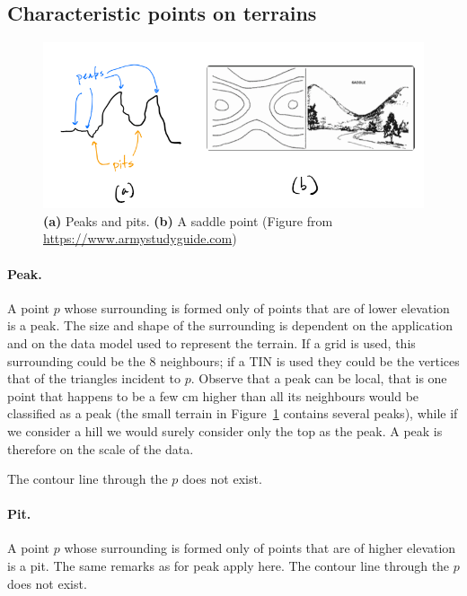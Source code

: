 \subsection{Characteristic points on terrains}

\begin{figure}
  \centering
  \includegraphics[width=\linewidth]{figs/feature_points}
  \caption{\textbf{(a)} Peaks and pits. \textbf{(b)} A saddle point (Figure from \url{https://www.armystudyguide.com})}
\label{fig:feature_points}
\end{figure}


\paragraph{Peak.}
A point $p$ whose surrounding is formed only of points that are of lower elevation is a peak.
The size and shape of the surrounding is dependent on the application and on the data model used to represent the terrain.
If a grid is used, this surrounding could be the 8 neighbours; if a TIN is used they could be the vertices that of the triangles incident to $p$.
Observe that a peak can be local, that is one point that happens to be a few cm higher than all its neighbours would be classified as a peak (the small terrain in Figure~\ref{fig:feature_points} contains several peaks), while if we consider a hill we would surely consider only the top as the peak.
A peak is therefore on the scale of the data.

The contour line through the $p$ does not exist.

\paragraph{Pit.}
A point $p$ whose surrounding is formed only of points that are of higher elevation is a pit.
The same remarks as for peak apply here.
The contour line through the $p$ does not exist.

